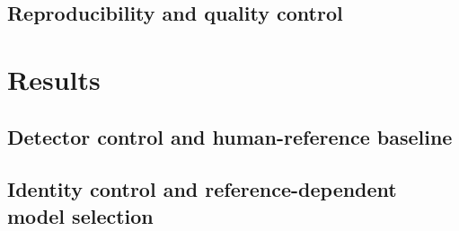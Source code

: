 \documentclass{elektr}
\begin{document}
\subsection*{Reproducibility and quality control}

\section*{Results} \label{sec:results}

\subsection*{Detector control and human-reference baseline}

\subsection*{Identity control and reference-dependent model selection}
\end{document}
